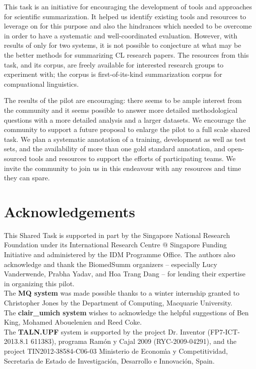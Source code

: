 \documentclass[11pt]{article}
\begin{document}
This task is an initiative for encouraging the development of tools and 
approaches for scientific summarization. It helped us identify 
existing tools and resources to leverage on for this purpose
and also the hindrances which needed to be overcome in order to have a 
systematic and well-coordinated evaluation. However, with results of 
only for two systems, it is not possible to conjecture at what may be the 
better methods for summarizing CL research papers. The 
resources from this task, and its corpus, are freely available 
for interested research groups to experiment with; the corpus is 
first-of-its-kind summarization corpus for compuational linguistics.

The results of the pilot are encouraging: there seems to be ample
interest from the community and it seems possible to answer more
detailed methodological questions with a more detailed analysis and a
larger datasets.  We encourage the community to support a future
proposal to enlarge the pilot to a full scale shared task.  We plan a
systematic annotation of a training, development as well as test sets,
and the availability of more than one gold standard annotation, and
open-sourced tools and resources to support the efforts of
participating teams. We invite the community to join us in this
endeavour with any resources and time they can spare.



\section{Acknowledgements}
 This Shared Task is supported in part by the Singapore National
 Research Foundation under its International Research Centre @
 Singapore Funding Initiative and administered by the IDM Programme
 Office.  The authors also acknowledge and thank the BiomedSumm
 organizers -- especially Lucy Vanderwende, Prabha Yadav, and Hoa
 Trang Dang -- for lending their expertise in organizing this pilot.\\
 The {\bf MQ system} was made possible thanks to a winter internship
 granted to Christopher Jones by the Department of Computing,
 Macquarie University. \\ The {\bf clair\_umich system} wishes to
 acknowledge the helpful suggestions of Ben King, Mohamed Abouelenien
 and Reed Coke. \\ The {\bf TALN.UPF} system is supported by the
 project Dr. Inventor (FP7-ICT-2013.8.1 611383), programa Ram\'on y
 Cajal 2009 (RYC-2009-04291), and the project TIN2012-38584-C06-03
 Ministerio de Econom\'{\i}a y Competitividad, Secretar\'{\i}a de
 Estado de Investigaci\'on, Desarrollo e Innovaci\'on, Spain.


\end{document}
